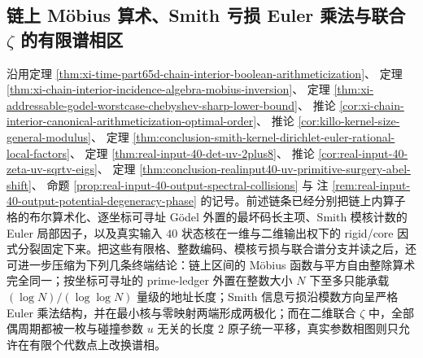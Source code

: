 \subsection{链上 Möbius 算术、Smith 亏损 Euler 乘法与联合 \texorpdfstring{$\zeta$}{zeta} 的有限谱相区}\label{subsec:conclusion-chain-godel-smith-jointzeta-finite-phase}

沿用定理 \ref{thm:xi-time-part65d-chain-interior-boolean-arithmeticization}、
定理 \ref{thm:xi-chain-interior-incidence-algebra-mobius-inversion}、
定理 \ref{thm:xi-addressable-godel-worstcase-chebyshev-sharp-lower-bound}、
推论 \ref{cor:xi-chain-interior-canonical-arithmeticization-optimal-order}、
推论 \ref{cor:killo-kernel-size-general-modulus}、
定理 \ref{thm:conclusion-smith-kernel-dirichlet-euler-rational-local-factors}、
定理 \ref{thm:real-input-40-det-uv-2plus8}、
推论 \ref{cor:real-input-40-zeta-uv-sqrtv-eigs}、
定理 \ref{thm:conclusion-realinput40-uv-primitive-surgery-abel-shift}、
命题 \ref{prop:real-input-40-output-spectral-collisions} 与
注 \ref{rem:real-input-40-output-potential-degeneracy-phase} 的记号。前述链条已经分别把链上内算子格的布尔算术化、逐坐标可寻址 Gödel 外置的最坏码长主项、Smith 模核计数的 Euler 局部因子，以及真实输入 \(40\) 状态核在一维与二维输出权下的 rigid/core 因式分裂固定下来。把这些有限格、整数编码、模核亏损与联合谱分支并读之后，还可进一步压缩为下列几条终端结论：链上区间的 Möbius 函数与平方自由整除算术完全同一；按坐标可寻址的 prime-ledger 外置在整数大小 \(N\) 下至多只能承载 \((\log N)/(\log\log N)\) 量级的地址长度；Smith 信息亏损沿模数方向呈严格 Euler 乘法结构，并在最小核与零映射两端形成两极化；而在二维联合 \(\zeta\) 中，全部偶周期都被一枚与碰撞参数 \(u\) 无关的长度 \(2\) 原子统一平移，真实参数相图则只允许在有限个代数点上改换谱相。

